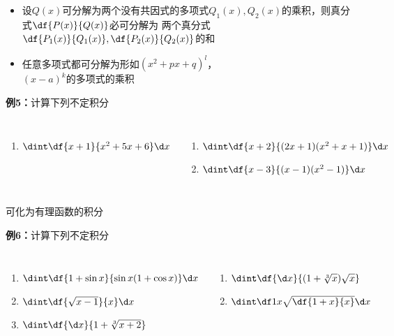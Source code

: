 \begin{frame}
	\linespread{1.2}
	\begin{itemize}
	  \item
	  设$Q(x)$可分解为两个没有共因式的多项式$Q_1(x),Q_2(x)$的乘积，则真分式$\df{P(x)}{Q(x)}$必可分解为
	  两个真分式$\df{P_1(x)}{Q_1(x)},\df{P_2(x)}{Q_2(x)}$的和\pause 
	  \item 任意多项式都可分解为形如$(x^2+px+q)^l$，\\
	  $(x-a)^k$的多项式的乘积\pause 
	\end{itemize}
	\begin{exampleblock}{{\bf 例5：}计算下列不定积分\hfill}\pause 
		\begin{columns}[t]
				\begin{enumerate}
				  \item $\dint\df{x+1}{x^2+5x+6}\d x$\pause 
				\end{enumerate}
				\begin{enumerate}
				  \addtocounter{enumi}{1}
				  \item $\dint\df{x+2}{(2x+1)(x^2+x+1)}\d x$\pause 
				  \item $\dint\df{x-3}{(x-1)(x^2-1)}\d x$
				\end{enumerate}
		\end{columns}
	\end{exampleblock}
\end{frame}

\begin{frame}{可化为有理函数的积分}
	\linespread{2}\pause 
	\begin{exampleblock}{{\bf 例6：}计算下列不定积分\hfill}\pause 
		\begin{columns}[t]
				\begin{enumerate}
				  \item $\dint\df{1+\sin x}{\sin x(1+\cos x)}\d x$\pause 
				  \item $\dint\df{\sqrt{x-1}}{x}\d x$\pause 
				  \item $\dint\df{\d x}{1+\sqrt[3]{x+2}}$\pause 
				\end{enumerate}
				\begin{enumerate}
				  \addtocounter{enumi}{3}
				  \item $\dint\df{\d x}{(1+\sqrt[3]{x})\sqrt x}$\pause 
				  \item $\dint\df 1x\sqrt{\df{1+x}{x}}\d x$
				\end{enumerate}
		\end{columns}
	\end{exampleblock}
\end{frame}

